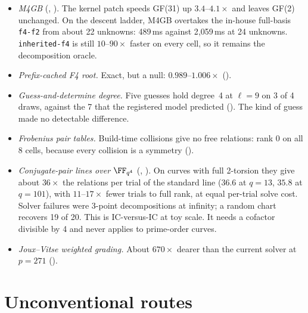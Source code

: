 \begin{itemize}
\item \emph{M4GB} (,
  ). The kernel patch
  speeds GF(31) up $3.4$--$4.1\times$ and leaves GF(2) unchanged. On the
  descent ladder, M4GB overtakes the in-house full-basis \texttt{f4-f2}
  from about 22 unknowns: 489\,ms against 2{,}059\,ms at 24 unknowns.
  \texttt{inherited-f4} is still $10$--$90\times$ faster on every cell, so
  it remains the decomposition oracle.
\item \emph{Prefix-cached F4 root.} Exact, but a null: $0.989$--$1.006\times$
  ().
\item \emph{Guess-and-determine degree.} Five guesses hold degree~4 at
  $\ell=9$ on 3 of 4 draws, against the 7 that the registered model
  predicted (). The
  kind of guess made no detectable difference.
\item \emph{Frobenius pair tables.} Build-time collisions give no free
  relations: rank 0 on all 8 cells, because every collision is a symmetry
  ().
\item \emph{Conjugate-pair lines over $\FF_{q^4}$}
  (,
  ).
  On curves with full 2-torsion they give about $36\times$ the relations per
  trial of the standard line ($36.6$ at $q=13$, $35.8$ at $q=101$), with
  $11$--$17\times$ fewer trials to full rank, at equal per-trial solve cost.
  Solver failures were 3-point decompositions at infinity; a random chart
  recovers 19 of 20. This is IC-versus-IC at toy scale. It needs a cofactor
  divisible by 4 and never applies to prime-order curves.
\item \emph{Joux--Vitse weighted grading.} About $670\times$ dearer than the
  current solver at $p=271$
  ().
\end{itemize}

\section{Unconventional routes}\label{sec:nov-exotic}

